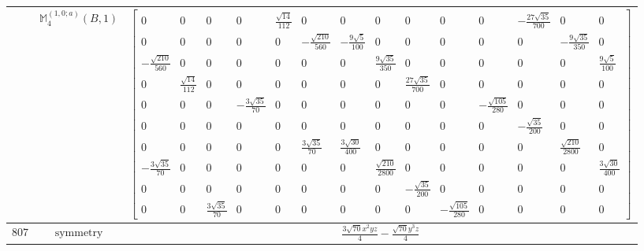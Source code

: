 \documentclass[fleqn,8pt,landscape]{jsarticle}
\begin{document}
\begin{longtable}{ccc}
$  $ & $ \mathbb{M}_{4}^{(1,0;a)}(B,1) $ & $ \begin{bmatrix} 0 & 0 & 0 & 0 & \frac{\sqrt{14}}{112} & 0 & 0 & 0 & 0 & 0 & 0 & - \frac{27 \sqrt{35}}{700} & 0 & 0 \\ 0 & 0 & 0 & 0 & 0 & - \frac{\sqrt{210}}{560} & - \frac{9 \sqrt{5}}{100} & 0 & 0 & 0 & 0 & 0 & - \frac{9 \sqrt{35}}{350} & 0 \\ - \frac{\sqrt{210}}{560} & 0 & 0 & 0 & 0 & 0 & 0 & \frac{9 \sqrt{35}}{350} & 0 & 0 & 0 & 0 & 0 & \frac{9 \sqrt{5}}{100} \\ 0 & \frac{\sqrt{14}}{112} & 0 & 0 & 0 & 0 & 0 & 0 & \frac{27 \sqrt{35}}{700} & 0 & 0 & 0 & 0 & 0 \\ 0 & 0 & 0 & - \frac{3 \sqrt{35}}{70} & 0 & 0 & 0 & 0 & 0 & 0 & - \frac{\sqrt{105}}{280} & 0 & 0 & 0 \\ 0 & 0 & 0 & 0 & 0 & 0 & 0 & 0 & 0 & 0 & 0 & - \frac{\sqrt{35}}{200} & 0 & 0 \\ 0 & 0 & 0 & 0 & 0 & \frac{3 \sqrt{35}}{70} & \frac{3 \sqrt{30}}{400} & 0 & 0 & 0 & 0 & 0 & \frac{\sqrt{210}}{2800} & 0 \\ - \frac{3 \sqrt{35}}{70} & 0 & 0 & 0 & 0 & 0 & 0 & \frac{\sqrt{210}}{2800} & 0 & 0 & 0 & 0 & 0 & \frac{3 \sqrt{30}}{400} \\ 0 & 0 & 0 & 0 & 0 & 0 & 0 & 0 & - \frac{\sqrt{35}}{200} & 0 & 0 & 0 & 0 & 0 \\ 0 & 0 & \frac{3 \sqrt{35}}{70} & 0 & 0 & 0 & 0 & 0 & 0 & - \frac{\sqrt{105}}{280} & 0 & 0 & 0 & 0 \end{bmatrix} $ \\ \hline
$ 807 $ & $ \text{symmetry} $ & $ \frac{3 \sqrt{70} x^{2} y z}{4} - \frac{\sqrt{70} y^{3} z}{4} $ \\

\end{longtable}
\end{document}
